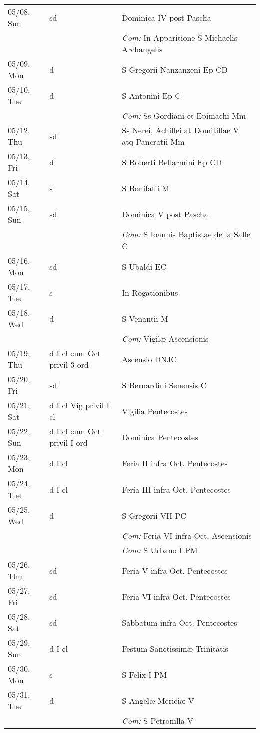 \documentclass[10pt]{article}
\begin{document}
\begin{longtable}{ l l l }
05/08, Sun & sd & Dominica IV post Pascha\\
 & & \textit{Com:} In Apparitione S Michaelis Archangelis\\
05/09, Mon & d & S Gregorii Nanzanzeni Ep CD\\
05/10, Tue & d & S Antonini Ep C\\
 & & \textit{Com:} Ss Gordiani et Epimachi Mm\\
05/12, Thu & sd & Ss Nerei, Achillei at Domitillae V atq Pancratii Mm\\
05/13, Fri & d & S Roberti Bellarmini Ep CD\\
05/14, Sat & s & S Bonifatii M\\
05/15, Sun & sd & Dominica V post Pascha\\
 & & \textit{Com:} S Ioannis Baptistae de la Salle C\\
05/16, Mon & sd & S Ubaldi EC\\
05/17, Tue & s & In Rogationibus\\
05/18, Wed & d & S Venantii M\\
 & & \textit{Com:} Vigilæ Ascensionis\\
05/19, Thu & d I cl cum Oct privil 3 ord & Ascensio DNJC\\
05/20, Fri & sd & S Bernardini Senensis C\\
05/21, Sat & d I cl Vig privil I cl & Vigilia Pentecostes\\
05/22, Sun & d I cl cum Oct privil I ord & Dominica Pentecostes\\
05/23, Mon & d I cl & Feria II infra Oct. Pentecostes\\
05/24, Tue & d I cl & Feria III infra Oct. Pentecostes\\
05/25, Wed & d & S Gregorii VII PC\\
 & & \textit{Com:} Feria VI infra Oct. Ascensionis\\
 & & \textit{Com:} S Urbano I PM\\
05/26, Thu & sd & Feria V infra Oct. Pentecostes\\
05/27, Fri & sd & Feria VI infra Oct. Pentecostes\\
05/28, Sat & sd & Sabbatum infra Oct. Pentecostes\\
05/29, Sun & d I cl & Festum Sanctissimæ Trinitatis\\
05/30, Mon & s & S Felix I PM\\
05/31, Tue & d & S Angelæ Mericiæ V\\
 & & \textit{Com:} S Petronilla V\\

\end{longtable}
\end{document}
